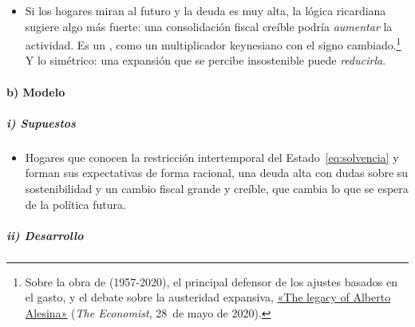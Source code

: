 \documentclass[11pt]{article}
\begin{document}
\begin{itemize}
\item Si los hogares miran al futuro y la deuda es muy alta, la lógica ricardiana sugiere algo más fuerte: una consolidación fiscal creíble podría \emph{aumentar} la actividad. Es un , como un multiplicador keynesiano con el signo cambiado\nocite{GiavazziPagano1990}.\footnote{Sobre la obra de  (1957-2020), el principal defensor de los ajustes basados en el gasto, y el debate sobre la austeridad expansiva, \href{https://www.economist.com/finance-and-economics/2020/05/28/the-legacy-of-alberto-alesina}{«The legacy of Alberto Alesina»} (\emph{The Economist}, 28~de mayo de 2020).} Y lo simétrico: una expansión que se percibe insostenible puede \emph{reducirla}.
\end{itemize}

\paragraph{b) Modelo}

\subparagraph{i) Supuestos}

\begin{itemize}
\item Hogares que conocen la restricción intertemporal del Estado~\eqref{eq:solvencia} y forman sus expectativas de forma racional, una deuda alta con dudas sobre su sostenibilidad y un cambio fiscal grande y creíble, que cambia lo que se espera de la política futura.
\end{itemize}

\subparagraph{ii) Desarrollo}
\end{document}
